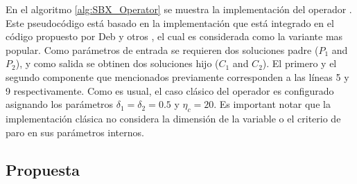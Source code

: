 En el algoritmo \ref{alg:SBX_Operator} se muestra la implementación del operador \SBX{}.
%
Este pseudocódigo está basado en la implementación que está integrado en el código \NSGAII propuesto por Deb y otros \cite{Joel:NSGAII}, el cual es considerada como la variante mas popular.
%
Como parámetros de entrada se requieren dos soluciones padre ($P_1$ and $P_2$), y como salida se obtinen dos soluciones hijo ($C_1$ and $C_2$).
%
El primero y el segundo componente que mencionados previamente corresponden a las líneas 5 y 9 respectivamente.
%
Como es usual, el caso clásico del operador \SBX{} es configurado asignando los parámetros $\delta_1 = \delta_2 = 0.5$ y $\eta_c = 20$.
%
Es important notar que la implementación clásica no considera la dimensión de la variable o el criterio de paro en sus parámetros internos.

\subsection{Propuesta}

